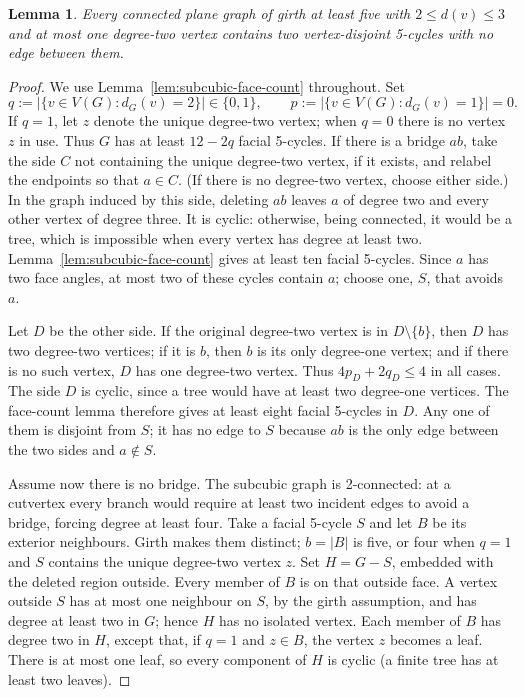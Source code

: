 \documentclass[11pt]{article}
\newtheorem{lemma}[theorem]{Lemma}
\theoremstyle{remark}
\numberwithin{equation}{section}
\numberwithin{table}{section}
\begin{document}
\begin{lemma}\label{lem:two-separated-five-faces}
Every connected plane graph of girth at least five with
$2\le d(v)\le3$ and at most one degree-two vertex contains
two vertex-disjoint 5-cycles with no edge between them.
\end{lemma}
\begin{proof}
We use Lemma~\ref{lem:subcubic-face-count} throughout.  Set
\[
 q:=|\{v\in V(G):d_G(v)=2\}|\in\{0,1\},\qquad
 p:=|\{v\in V(G):d_G(v)=1\}|=0.
\]
If $q=1$, let $z$ denote the unique degree-two vertex; when $q=0$
there is no vertex $z$ in use.  Thus $G$ has at least $12-2q$
facial 5-cycles.
If there is a bridge $ab$, take the side $C$ not containing the
unique degree-two vertex, if it exists, and relabel the endpoints so
that $a\in C$.  (If there is no degree-two vertex, choose either
side.)  In the graph induced by this side, deleting $ab$ leaves $a$
of degree two and every other vertex of degree three.  It is cyclic:
otherwise, being connected, it would be a tree, which is impossible
when every vertex has degree at least two.  Lemma~\ref{lem:subcubic-face-count}
gives at least
ten facial 5-cycles.  Since $a$ has two face angles, at most two of
these cycles contain $a$; choose one, $S$, that avoids $a$.

Let $D$ be the other side.  If the original degree-two vertex is in
$D\setminus\{b\}$, then $D$ has two degree-two vertices; if it is
$b$, then $b$ is its only degree-one vertex; and if there is no such
vertex, $D$ has one degree-two vertex.  Thus $4p_D+2q_D\le4$ in all
cases.  The side $D$ is cyclic, since a tree would have at least two
degree-one vertices.  The face-count lemma therefore gives at least
eight facial 5-cycles in $D$.  Any one of them is disjoint from $S$;
it has no edge to $S$ because $ab$ is the only edge between the two
sides and $a\notin S$.

Assume now there is no bridge. The subcubic graph is 2-connected:
at a cutvertex every branch would require at least two incident
edges to avoid a bridge, forcing degree at least four.
Take a facial 5-cycle $S$ and let $B$ be its exterior neighbours.
Girth makes them distinct; $b=|B|$ is five, or four when $q=1$
and $S$ contains the unique degree-two vertex $z$.
Set $H=G-S$, embedded with the deleted region outside.
Every member of $B$ is on that outside face.  A vertex outside $S$
has at most one neighbour on $S$, by the girth assumption, and has
degree at least two in $G$; hence $H$ has no isolated vertex.  Each
member of $B$ has degree two in $H$, except that, if $q=1$ and
$z\in B$, the vertex $z$ becomes a leaf.
There is at most one leaf, so every component of $H$ is cyclic (a
finite tree has at least two leaves).


\end{proof}
\end{document}
